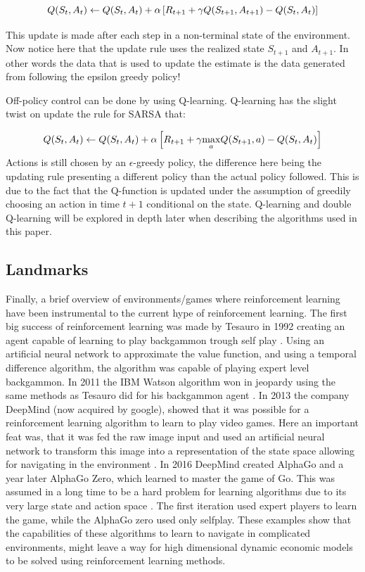\begin{equation}
    Q(S_t, A_t) \leftarrow Q(S_t, A_t) + \alpha \left[ R_{t+1} + \gamma Q(S_{t+1}, A_{t+1}) - Q(S_t, A_t) \right]
\end{equation}

This update is made after each step in a non-terminal state of the environment. 
Now notice here that the update rule uses the realized state $S_{t+1}$ and $A_{t+1}$. In other words the data that is used to update the estimate is the data generated from following the epsilon greedy policy! 

Off-policy control can be done by using Q-learning. Q-learning has the slight twist on update the rule for SARSA that:

\begin{equation}
    Q(S_t, A_t) \leftarrow Q(S_t, A_t) + \alpha \left[ R_{t+1} + \gamma \underset{a}{\max} Q(S_{t + 1}, a) - Q(S_t, A_t) \right] 
\end{equation}
Actions is still chosen by an $\epsilon$-greedy policy, the difference here being the updating rule presenting a different policy than the actual policy followed. This is due to the fact that the Q-function is updated under the assumption of greedily choosing an action in time $t+1$ conditional on the state. Q-learning and double Q-learning will be explored in depth later when describing the algorithms used in this paper.

\subsection{Landmarks}

Finally, a brief overview of environments/games where reinforcement learning have been instrumental to the current hype of reinforcement learning. The first big success of reinforcement learning was made by Tesauro in 1992 creating an agent capable of learning to play backgammon trough self play \parencite{sutton_reinforcement_2018}. Using an artificial neural network to approximate the value function, and using a temporal difference algorithm, the algorithm was capable of playing expert level backgammon. In 2011 the IBM Watson algorithm won in jeopardy using the same methods as Tesauro did for his backgammon agent \parencite{sutton_reinforcement_2018}. In 2013 the company DeepMind (now acquired by google), showed that it was possible for a reinforcement learning algorithm to learn to play video games. Here an important feat was, that it was fed the raw image input and used an artificial neural network to transform this image into a representation of the state space allowing for navigating in the environment \parencite{mnih_playing_2013}. In 2016 DeepMind created AlphaGo and a year later AlphaGo Zero, which learned to master the game of Go. This was assumed in a long time to be a hard problem for learning algorithms due to its very large state and action space \parencite{silver_general_2018}. The first iteration used expert players to learn the game, while the AlphaGo zero used only selfplay. These examples show that the capabilities of these algorithms to learn to navigate in complicated environments, might leave a way for high dimensional dynamic economic models to be solved using reinforcement learning methods.